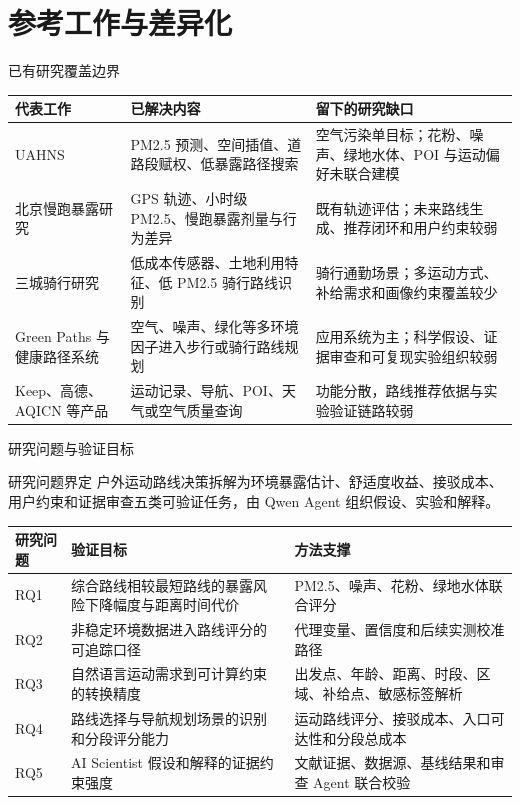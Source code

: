 \documentclass[xcolor=table,dvipsnames,svgnames,aspectratio=169]{ctexbeamer}
\begin{document}
\section{参考工作与差异化}

\begin{frame}{已有研究覆盖边界}
  \scriptsize
  \begin{tabularx}{\textwidth}{p{}p{}Y}
    \toprule
    代表工作 & 已解决内容 & 留下的研究缺口 \\
    \midrule
    UAHNS & PM2.5 预测、空间插值、道路段赋权、低暴露路径搜索 & 空气污染单目标；花粉、噪声、绿地水体、POI 与运动偏好未联合建模 \\
    北京慢跑暴露研究 & GPS 轨迹、小时级 PM2.5、慢跑暴露剂量与行为差异 & 既有轨迹评估；未来路线生成、推荐闭环和用户约束较弱 \\
    三城骑行研究 & 低成本传感器、土地利用特征、低 PM2.5 骑行路线识别 & 骑行通勤场景；多运动方式、补给需求和画像约束覆盖较少 \\
    Green Paths 与健康路径系统 & 空气、噪声、绿化等多环境因子进入步行或骑行路线规划 & 应用系统为主；科学假设、证据审查和可复现实验组织较弱 \\
    Keep、高德、AQICN 等产品 & 运动记录、导航、POI、天气或空气质量查询 & 功能分散，路线推荐依据与实验验证链路较弱 \\
    \bottomrule
  \end{tabularx}
\end{frame}

\begin{frame}{研究问题与验证目标}
  \small
  \begin{block}{研究问题界定}
    户外运动路线决策拆解为环境暴露估计、舒适度收益、接驳成本、用户约束和证据审查五类可验证任务，由 Qwen Agent 组织假设、实验和解释。
  \end{block}

  \vspace{0.35em}
  \scriptsize
  \begin{tabularx}{\textwidth}{p{}Y p{0.34\textwidth}}
    \toprule
    研究问题 & 验证目标 & 方法支撑 \\
    \midrule
    RQ1 & 综合路线相较最短路线的暴露风险下降幅度与距离时间代价 & PM2.5、噪声、花粉、绿地水体联合评分 \\
    RQ2 & 非稳定环境数据进入路线评分的可追踪口径 & 代理变量、置信度和后续实测校准路径 \\
    RQ3 & 自然语言运动需求到可计算约束的转换精度 & 出发点、年龄、距离、时段、区域、补给点、敏感标签解析 \\
    RQ4 & 路线选择与导航规划场景的识别和分段评分能力 & 运动路线评分、接驳成本、入口可达性和分段总成本 \\
    RQ5 & AI Scientist 假设和解释的证据约束强度 & 文献证据、数据源、基线结果和审查 Agent 联合校验 \\
    \bottomrule
  \end{tabularx}
\end{frame}
\end{document}
